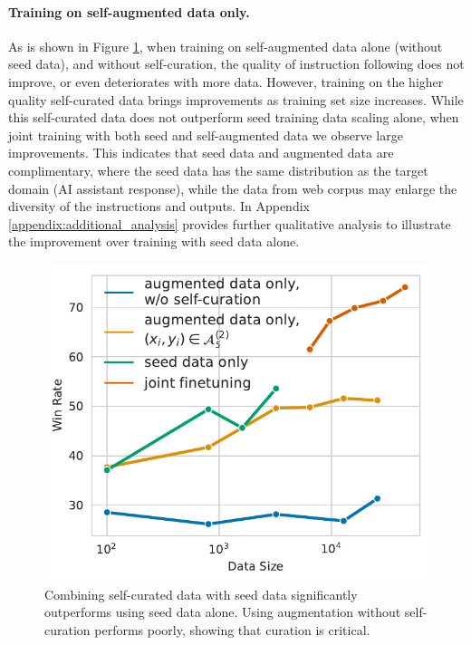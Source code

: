 \paragraph{Training on self-augmented data only.} As is shown in Figure \ref{fig:aug_data_only}, when training on self-augmented data alone (without seed data), and without self-curation, the quality of instruction following does not improve, or even  deteriorates with more data. However, training on the higher quality self-curated data brings improvements as training set size increases. While this self-curated data  does not outperform seed training data scaling alone, when joint training with both seed and self-augmented data we observe large improvements. This indicates that seed data and augmented data are complimentary, where the seed data has the same distribution as the target domain (AI assistant response), while the data from web corpus may enlarge the diversity of the instructions and outputs. In Appendix \ref{appendix:additional_analysis} provides further qualitative analysis to illustrate the improvement over training with seed data alone.

\begin{figure}
  \centering
  \includegraphics[width=0.45\columnwidth]{figs/data_scaling_bt_only.pdf}
  \caption{Combining self-curated data with seed data significantly outperforms using seed data alone. Using augmentation without self-curation performs poorly, showing that curation is critical. 
  }
  \label{fig:aug_data_only}
\end{figure}


